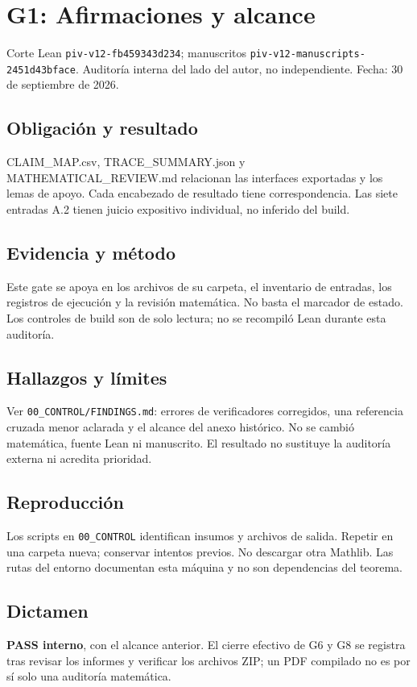 \section{G1: Afirmaciones y alcance}\label{g1-afirmaciones-y-alcance}

Corte Lean \texttt{piv-v12-fb459343d234}; manuscritos
\texttt{piv-v12-manuscripts-2451d43bface}. Auditoría interna del lado
del autor, no independiente. Fecha: 30 de septiembre de 2026.

\subsection{Obligación y resultado}\label{obligaciuxf3n-y-resultado}

CLAIM\_MAP.csv, TRACE\_SUMMARY.json y MATHEMATICAL\_REVIEW.md relacionan
las interfaces exportadas y los lemas de apoyo. Cada encabezado de
resultado tiene correspondencia. Las siete entradas A.2 tienen juicio
expositivo individual, no inferido del build.

\subsection{Evidencia y método}\label{evidencia-y-muxe9todo}

Este gate se apoya en los archivos de su carpeta, el inventario de
entradas, los registros de ejecución y la revisión matemática. No basta
el marcador de estado. Los controles de build son de solo lectura; no se
recompiló Lean durante esta auditoría.

\subsection{Hallazgos y límites}\label{hallazgos-y-luxedmites}

Ver \texttt{00\_CONTROL/FINDINGS.md}: errores de verificadores
corregidos, una referencia cruzada menor aclarada y el alcance del anexo
histórico. No se cambió matemática, fuente Lean ni manuscrito. El
resultado no sustituye la auditoría externa ni acredita prioridad.

\subsection{Reproducción}\label{reproducciuxf3n}

Los scripts en \texttt{00\_CONTROL} identifican insumos y archivos de
salida. Repetir en una carpeta nueva; conservar intentos previos. No
descargar otra Mathlib. Las rutas del entorno documentan esta máquina y
no son dependencias del teorema.

\subsection{Dictamen}\label{dictamen}

\textbf{PASS interno}, con el alcance anterior. El cierre efectivo de G6
y G8 se registra tras revisar los informes y verificar los archivos ZIP;
un PDF compilado no es por sí solo una auditoría matemática.
